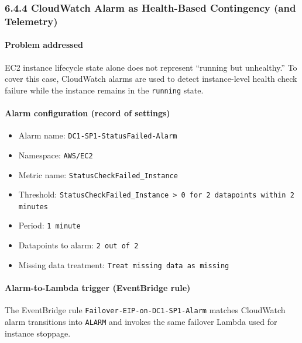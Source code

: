 \documentclass[11pt]{article}
\begin{document}
%
%
%
\subsubsection{6.4.4 CloudWatch Alarm as Health-Based Contingency (and Telemetry)}

\paragraph{Problem addressed}
EC2 instance lifecycle state alone does not represent ``running but unhealthy.'' To cover this case, CloudWatch alarms are used to detect instance-level health check failure while the instance remains in the \texttt{running} state.

\paragraph{Alarm configuration (record of settings)}
\begin{itemize}
  \item Alarm name: \texttt{DC1-SP1-StatusFailed-Alarm}
  \item Namespace: \texttt{AWS/EC2}
  \item Metric name: \texttt{StatusCheckFailed\_Instance}
  \item Threshold: \texttt{StatusCheckFailed\_Instance > 0 for 2 datapoints within 2 minutes}
  \item Period: \texttt{1 minute}
  \item Datapoints to alarm: \texttt{2 out of 2}
  \item Missing data treatment: \texttt{Treat missing data as missing}
\end{itemize}

\paragraph{Alarm-to-Lambda trigger (EventBridge rule)}
The EventBridge rule \texttt{Failover-EIP-on-DC1-SP1-Alarm} matches CloudWatch alarm transitions into \texttt{ALARM} and invokes the same failover Lambda used for instance stoppage.
\end{document}
